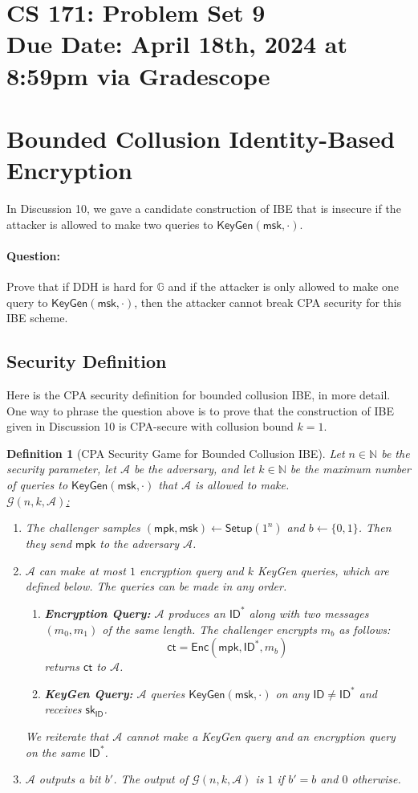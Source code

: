 \documentclass[11pt]{article}
\newtheorem{definition}[theorem]{Definition}
\numberwithin{equation}{section}
\newcommand{\enc}{\mathsf{Enc}}
\newcommand{\setup}{\mathsf{Setup}}
\newcommand{\keygen}{\mathsf{KeyGen}}
\newcommand{\mpk}{\mathsf{mpk}}
\newcommand{\msk}{\mathsf{msk}}
\newcommand{\sk}{\mathsf{sk}}
\newcommand{\id}{\mathsf{ID}}
\newcommand{\ct}{\mathsf{ct}}
\newcommand{\A}{\mathcal{A}}
\newcommand{\G}{\mathcal{G}}
\newcommand{\GG}{\mathbb{G}}
\newcommand{\bin}{\{0,1\}}
\newcommand{\bit}{\bin}
\newcommand{\duedate}{April 18th, 2024 at 8:59pm via Gradescope}
\begin{document}
\section*{CS 171: Problem Set 9\\ {\small Due Date: \duedate} }

\section{Bounded Collusion Identity-Based Encryption}
In Discussion 10, we gave a candidate construction of IBE that is insecure if the attacker is allowed to make two queries to $\keygen(\msk, \cdot)$.

\paragraph{Question:} Prove that if DDH is hard for $\GG$ and if the attacker is only allowed to make one query to $\keygen(\msk, \cdot)$, then the attacker cannot break CPA security for this IBE scheme.

\subsection*{Security Definition}
Here is the CPA security definition for bounded collusion IBE, in more detail. One way to phrase the question above is to prove that the construction of IBE given in Discussion 10 is CPA-secure with collusion bound $k=1$.
\begin{definition}[CPA Security Game for Bounded Collusion IBE]
Let $n\in \mathbb{N}$ be the security parameter, let $\A$ be the adversary, and let $k \in \mathbb{N}$ be the maximum number of queries to $\keygen(\msk, \cdot)$ that $\A$ is allowed to make.\\

\underline{$\G(n, k, \A)$:}
\begin{enumerate}
    \item The challenger samples $(\mpk, \msk) \leftarrow \setup(1^n)$ and $b \leftarrow \bit$. Then they send $\mpk$ to the adversary $\A$.
    \item $\A$ can make at most $1$ encryption query and $k$ KeyGen queries, which are defined below. The queries can be made in any order.
    \begin{enumerate}
        \item \textbf{Encryption Query:} $\A$ produces an $\id^*$ along with two messages $(m_0, m_1)$ of the same length. The challenger encrypts $m_b$ as follows:
        \[\ct = \enc(\mpk, \id^*, m_b)\]
        returns $\ct$ to $\A$.
        \item \textbf{KeyGen Query:} $\A$ queries $\keygen(\msk, \cdot)$ on any $\id \neq \id^*$ and receives $\sk_\id$. 
    \end{enumerate}
    We reiterate that $\A$ cannot make a KeyGen query and an encryption query on the same $\id^*$.
    \item $\A$ outputs a bit $b'$. The output of $\G(n, k, \A)$ is $1$ if $b' = b$ and $0$ otherwise.
\end{enumerate}
\end{definition}
\end{document}
